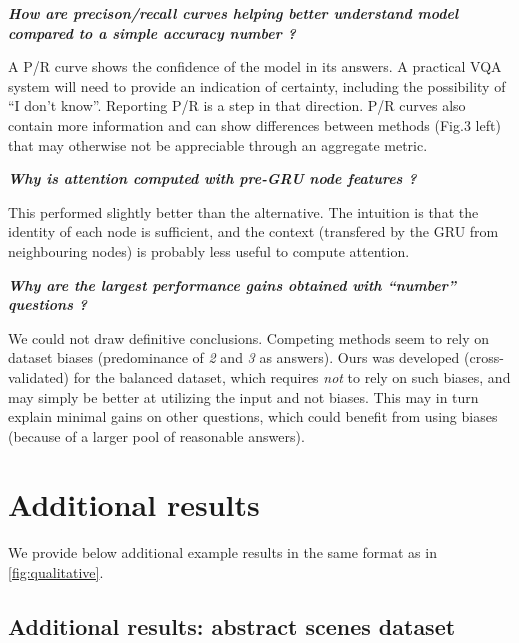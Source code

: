 \vspace{5pt}
\noindent\textbf{\textit{How are precison/recall curves helping better understand model compared to a simple accuracy number ?}}

\noindent
A P/R curve shows the confidence of the model in its answers. A practical VQA system will need to provide an indication of certainty, including the possibility of ``I don't know''. Reporting P/R is a step in that direction. P/R curves also contain more information and can show differences between methods (\eg Fig.3 left) that may otherwise not be appreciable through an aggregate metric.

\vspace{5pt}
\noindent\textbf{\textit{Why is attention computed with pre-GRU node features ?}}

\noindent
This performed slightly better than the alternative. The intuition is that the identity of each node is sufficient, and the context (transfered by the GRU from neighbouring nodes) is probably less useful to compute attention.

\vspace{5pt}
\noindent\textbf{\textit{Why are the largest performance gains obtained with ``number'' questions ?}}

\noindent
We could not draw definitive conclusions. Competing methods seem to rely on dataset biases (predominance of \textit{2} and \textit{3} as answers). Ours was developed (cross-validated) for the balanced dataset, which requires \emph{not} to rely on such biases, and may simply be better at utilizing the input and not biases. This may in turn explain minimal gains on other questions, which could benefit from using biases (because of a larger pool of reasonable answers).



\section{Additional results}

We provide below additional example results in the same format as in \fig\ref{fig:qualitative}.

\clearpage

\subsection{Additional results: abstract scenes dataset}
\vspace{10mm}

